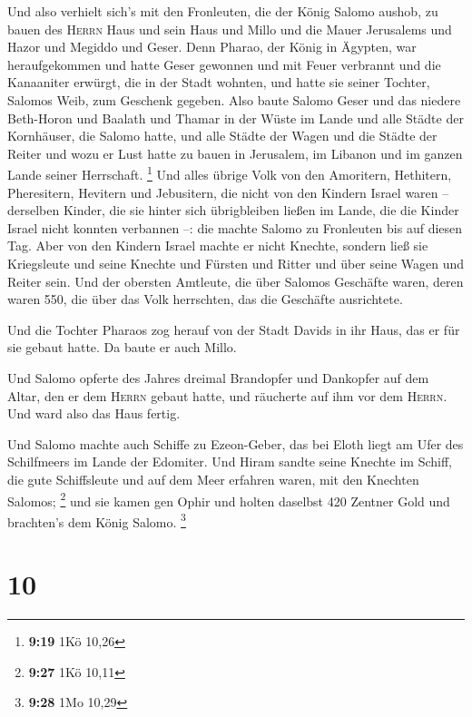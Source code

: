  Und also verhielt sich's mit den Fronleuten, die der
König Salomo aushob, zu bauen des \textsc{Herrn} Haus und sein Haus und
Millo und die Mauer Jerusalems und Hazor und Megiddo und Geser.
 Denn Pharao, der König in Ägypten, war heraufgekommen
und hatte Geser gewonnen und mit Feuer verbrannt und die Kanaaniter
erwürgt, die in der Stadt wohnten, und hatte sie seiner Tochter, Salomos
Weib, zum Geschenk gegeben.  Also baute Salomo Geser und
das niedere Beth-Horon  und Baalath und Thamar in der
Wüste im Lande  und alle Städte der Kornhäuser, die
Salomo hatte, und alle Städte der Wagen und die Städte der Reiter und
wozu er Lust hatte zu bauen in Jerusalem, im Libanon und im ganzen Lande
seiner Herrschaft. \footnote{\textbf{9:19} 1Kö 10,26} 
Und alles übrige Volk von den Amoritern, Hethitern, Pheresitern,
Hevitern und Jebusitern, die nicht von den Kindern Israel waren --
 derselben Kinder, die sie hinter sich übrigbleiben
ließen im Lande, die die Kinder Israel nicht konnten verbannen --: die
machte Salomo zu Fronleuten bis auf diesen Tag.  Aber von
den Kindern Israel machte er nicht Knechte, sondern ließ sie Kriegsleute
und seine Knechte und Fürsten und Ritter und über seine Wagen und Reiter
sein.  Und der obersten Amtleute, die über Salomos
Geschäfte waren, deren waren 550, die über das Volk herrschten, das die
Geschäfte ausrichtete.

 Und die Tochter Pharaos zog herauf von der Stadt Davids
in ihr Haus, das er für sie gebaut hatte. Da baute er auch Millo.

 Und Salomo opferte des Jahres dreimal Brandopfer und
Dankopfer auf dem Altar, den er dem \textsc{Herrn} gebaut hatte, und
räucherte auf ihm vor dem \textsc{Herrn}. Und ward also das Haus fertig.

 Und Salomo machte auch Schiffe zu Ezeon-Geber, das bei
Eloth liegt am Ufer des Schilfmeers im Lande der Edomiter.
 Und Hiram sandte seine Knechte im Schiff, die gute
Schiffsleute und auf dem Meer erfahren waren, mit den Knechten Salomos;
\footnote{\textbf{9:27} 1Kö 10,11}  und sie kamen gen
Ophir und holten daselbst 420 Zentner Gold und brachten's dem König
Salomo. \footnote{\textbf{9:28} 1Mo 10,29}

\hypertarget{section-2}{%
\section{10}\label{section-2}}

